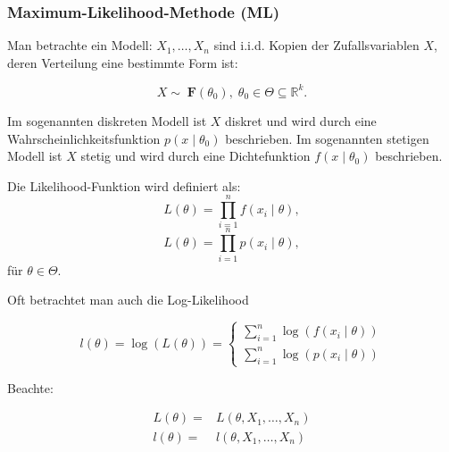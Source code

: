 \documentclass[10pt]{article}
\newcommand{\FZV}{X_1, \ldots, X_n} %
\newcommand{\IR}{\mathbb{R}} %
\newcommand{\eqname}[1]{\tag*{#1}}%
\begin{document}
	
	\subsubsection{Maximum-Likelihood-Methode (ML)}
	
	Man betrachte ein Modell: $\FZV$ sind i.i.d. Kopien der Zufallsvariablen $X$, deren Verteilung eine bestimmte Form ist: 
	
	\begin{equation*}
		X \sim \; \textbf{F} (\theta_0), \;	\theta_0 \in \Theta \subseteq \IR^k.
	\end{equation*}
	 
	\noindent Im sogenannten diskreten Modell ist $X$ diskret und wird durch eine Wahrscheinlichkeitsfunktion $p(x \mid \theta_0)$ beschrieben. 
	Im sogenannten stetigen Modell ist $X$ stetig und wird durch eine Dichtefunktion $f(x \mid \theta_0)$ beschrieben. 
	
	\begin{Definition} 
		Die Likelihood-Funktion wird definiert als:
		\begin{equation*}
			L(\theta) = \prod_{i=1}^{n} f(x_i \mid \theta), \eqname{wenn stetig}
		\end{equation*}
		\begin{equation*}
			L(\theta) = \prod_{i=1}^{n} p(x_i \mid \theta), \eqname{wenn diskret}
		\end{equation*}
		für $\theta \in \Theta$.
	\end{Definition}
	
	Oft betrachtet man auch die Log-Likelihood
	
	\begin{Definition} 
		\begin{equation*}
			l(\theta) = \log ( L(\theta)) = \begin{cases}
				\sum_{i=1}^{n} \log (f(x_i \mid \theta))\\
				\sum_{i=1}^{n} \log (p(x_i \mid \theta)) 
			\end{cases}
		\end{equation*}
	\end{Definition}
	
	Beachte: 
	
	\begin{equation*}
		\begin{split}
			L(\theta) =& L(\theta, \FZV)\\
			l(\theta) =&l(\theta, \FZV)
		\end{split}
	\end{equation*}
	
\end{document}
